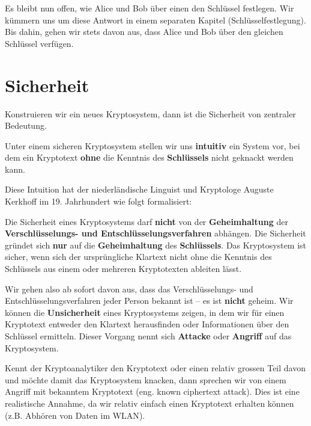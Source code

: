Es bleibt nun offen, wie Alice und Bob über einen  den Schlüssel festlegen. Wir kümmern uns um diese Antwort in einem separaten Kapitel (Schlüsselfestlegung). Bis dahin, gehen wir stets davon aus, dass Alice und Bob über den gleichen Schlüssel verfügen.

\section{Sicherheit}

Konstruieren wir ein neues Kryptosystem, dann ist die Sicherheit von zentraler Bedeutung. 

\begin{important}
Unter einem sicheren Kryptosystem stellen wir uns \textbf{intuitiv} ein System vor, bei dem ein Kryptotext \textbf{ohne} die Kenntnis des \textbf{Schlüssels} nicht geknackt werden kann.
\end{important}

Diese Intuition hat der niederländische  Linguist und Kryptologe Auguste Kerkhoff im 19. Jahrhundert wie folgt formalisiert:

\begin{definition}
Die Sicherheit eines Kryptosystems darf \textbf{nicht} von der \textbf{Geheimhaltung} der \textbf{Verschlüsselungs- und Entschlüsselungsverfahren} abhängen. Die Sicherheit gründet sich \textbf{nur} auf die \textbf{Geheimhaltung} des \textbf{Schlüssels}. Das Kryptosystem ist sicher, wenn sich der ursprüngliche Klartext nicht ohne die Kenntnis des Schlüssels aus einem oder mehreren Kryptotexten ableiten lässt.
\end{definition}

Wir gehen also ab sofort davon aus, dass das Verschlüsselungs- und Entschlüsselungsverfahren jeder Person bekannt ist -- es ist \textbf{nicht} geheim. Wir können die \textbf{Unsicherheit} eines Kryptosystems zeigen, in dem wir für einen Kryptotext entweder den Klartext herausfinden oder Informationen über den Schlüssel ermitteln. Dieser Vorgang nennt sich \textbf{Attacke} oder \textbf{Angriff} auf das Kryptosystem.

\begin{definition}
Kennt der Kryptoanalytiker den Kryptotext oder einen relativ grossen Teil davon und möchte damit das Kryptosystem knacken, dann sprechen wir von einem Angriff mit bekanntem Kryptotext (eng. known ciphertext attack). Dies ist eine realistische Annahme, da wir relativ einfach einen Kryptotext erhalten können (z.B. Abhören von Daten im \ac{WLAN}).
\end{definition}

